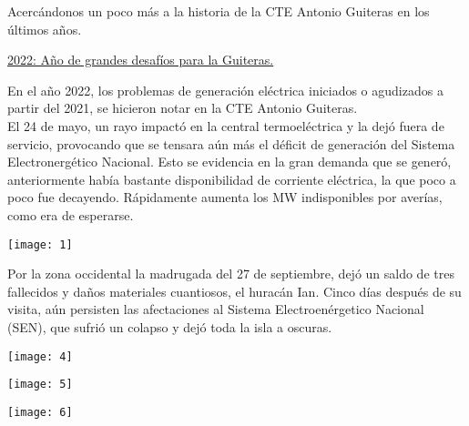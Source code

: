 \documentclass{article}
\begin{document}
\vspace{0.5cm}

Acercándonos un poco más a la historia de la CTE Antonio Guiteras en los últimos años.\\
\begin{center}
    \underline{2022: Año de grandes desafíos para la Guiteras.}
\end{center}

En el año 2022, los problemas de generación eléctrica iniciados o agudizados a partir del 2021, se hicieron notar en la CTE Antonio Guiteras.\\
El 24 de mayo, un rayo impactó en la central termoeléctrica y la dejó fuera de servicio, provocando que se tensara aún más el déficit de generación del Sistema Electronergético Nacional. Esto se evidencia en la gran demanda que se generó, anteriormente había bastante disponibilidad de corriente eléctrica, la que poco a poco fue decayendo. Rápidamente aumenta los MW indisponibles por averías, como era de esperarse.\\
\vspace{1cm}
\begin{center}
   \texttt{[image: 1]} \\
\end{center}

\vspace{1cm}

Por la zona occidental la madrugada del 27 de septiembre, dejó un saldo de tres fallecidos y daños materiales cuantiosos, el huracán Ian. Cinco días después de su visita, aún persisten las afectaciones al Sistema Electroenérgetico Nacional (SEN), que sufrió un colapso y dejó toda la isla a oscuras.\\

\vspace{0.5cm}
\begin{center}
   \texttt{[image: 4]} \\
\end{center}

\vspace{0.5cm}
\begin{center}
    \texttt{[image: 5]}\\
\end{center}


\vspace{0.5cm}
\begin{center}
    \texttt{[image: 6]}\\
\end{center}
\end{document}
